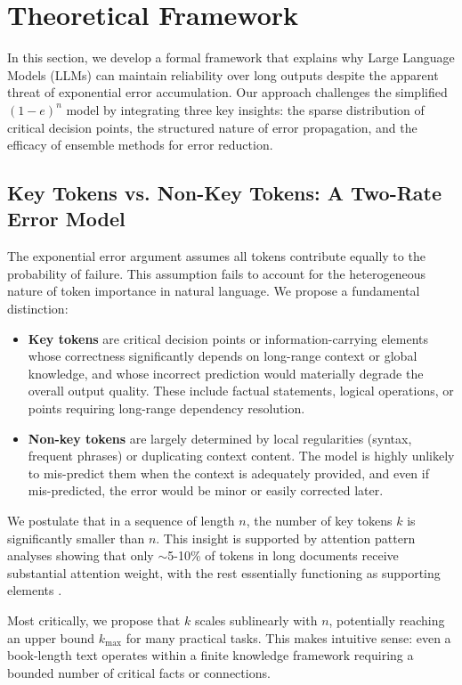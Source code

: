 \documentclass{article}
\begin{document}
\section{Theoretical Framework}

In this section, we develop a formal framework that explains why Large Language Models (LLMs) can maintain reliability over long outputs despite the apparent threat of exponential error accumulation. Our approach challenges the simplified $(1-e)^n$ model by integrating three key insights: the sparse distribution of critical decision points, the structured nature of error propagation, and the efficacy of ensemble methods for error reduction.

\subsection{Key Tokens vs. Non-Key Tokens: A Two-Rate Error Model}

The exponential error argument assumes all tokens contribute equally to the probability of failure. This assumption fails to account for the heterogeneous nature of token importance in natural language. We propose a fundamental distinction:

\begin{itemize}
\item \textbf{Key tokens} are critical decision points or information-carrying elements whose correctness significantly depends on long-range context or global knowledge, and whose incorrect prediction would materially degrade the overall output quality. These include factual statements, logical operations, or points requiring long-range dependency resolution.

\item \textbf{Non-key tokens} are largely determined by local regularities (syntax, frequent phrases) or duplicating context content. The model is highly unlikely to mis-predict them when the context is adequately provided, and even if mis-predicted, the error would be minor or easily corrected later.
\end{itemize}

We postulate that in a sequence of length $n$, the number of key tokens $k$ is significantly smaller than $n$. This insight is supported by attention pattern analyses showing that only $\sim$5-10\% of tokens in long documents receive substantial attention weight, with the rest essentially functioning as supporting elements \citep{fang2024what}.

Most critically, we propose that $k$ scales sublinearly with $n$, potentially reaching an upper bound $k_{\max}$ for many practical tasks. This makes intuitive sense: even a book-length text operates within a finite knowledge framework requiring a bounded number of critical facts or connections.
\end{document}
